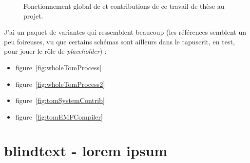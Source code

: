 \begin{figure}[H]
  \begin{center}
    
  \end{center}
  \caption{Fonctionnement global de {\tom} et contributions de ce travail de thèse au projet.}
  \label{fig:wholeTomProcessContrib}
\end{figure}

J'ai un paquet de variantes qui ressemblent beaucoup (les références semblent
un peu foireuses, vu que certains schémas sont ailleurs dans le tapuscrit, en
test, pour jouer le rôle de \emph{placeholder}) :
\begin{itemize}
  \item figure~\ref{fig:wholeTomProcess}
  \item figure~\ref{fig:wholeTomProcess2}
  \item figure~\ref{fig:tomSystemContrib}
  \item figure~\ref{fig:tomEMFCompiler}
\end{itemize}





\break
\section{blindtext - lorem ipsum}
\blindtext

\blindtext
